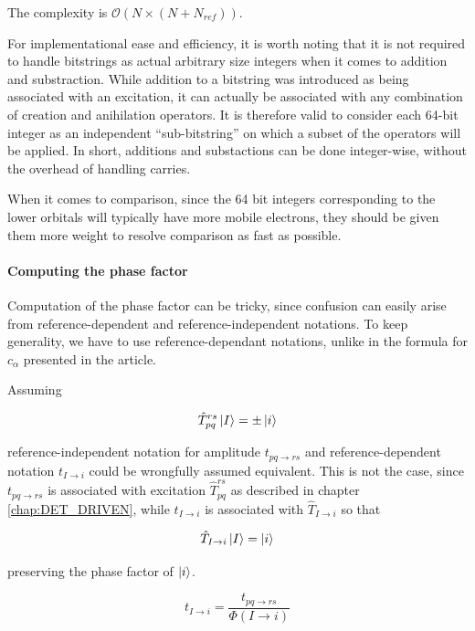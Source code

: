 \documentclass[./thesis.tex]{subfiles}
\begin{document}
The complexity is $\mathcal{O}(N \times (N+N_{ref}))$.


For implementational ease and efficiency, it is worth noting that it is not required to handle bitstrings as actual arbitrary size integers when it comes to addition and substraction. While addition to a bitstring was introduced as being associated with an excitation, it can actually be associated with any combination of creation and anihilation operators. It is therefore valid to consider each 64-bit integer as an independent ``sub-bitstring'' on which a subset of the operators will be applied. In short, additions and substactions can be done integer-wise, without the overhead of handling carries.

When it comes to comparison, since the 64 bit integers corresponding to the lower orbitals will typically have more mobile electrons, they should be given them more weight to resolve comparison as fast as possible.

\paragraph{Computing the phase factor}



Computation of the phase factor can be tricky, since confusion can easily arise from reference-dependent and reference-independent notations. To keep generality, we have to use reference-dependant notations, unlike in the formula for $c_\alpha$ presented in the article.

Assuming

\begin{equation}
\hat T_{pq}^{rs} \ket I = \pm \ket i
\end{equation}

reference-independent notation for amplitude $t_{pq \rightarrow rs}$ and reference-dependent notation $t_{I \rightarrow i}$ could be wrongfully assumed equivalent. This is not the case, since $t_{pq \rightarrow rs}$ is associated with excitation $\hat T_{pq}^{rs}$ as described in chapter \ref{chap:DET_DRIVEN}, while $t_{I \rightarrow i}$ is associated with $\hat T_{I \rightarrow i}$ so that

\begin{equation}
\hat T_{I \rightarrow i}  \ket I = \ket i
\end{equation}

preserving the phase factor of $\ket i$.


\begin{equation}
t_{I \rightarrow i} = \frac{t_{pq \rightarrow rs}}{\Phi(I \rightarrow i)}
\end{equation}
\end{document}

